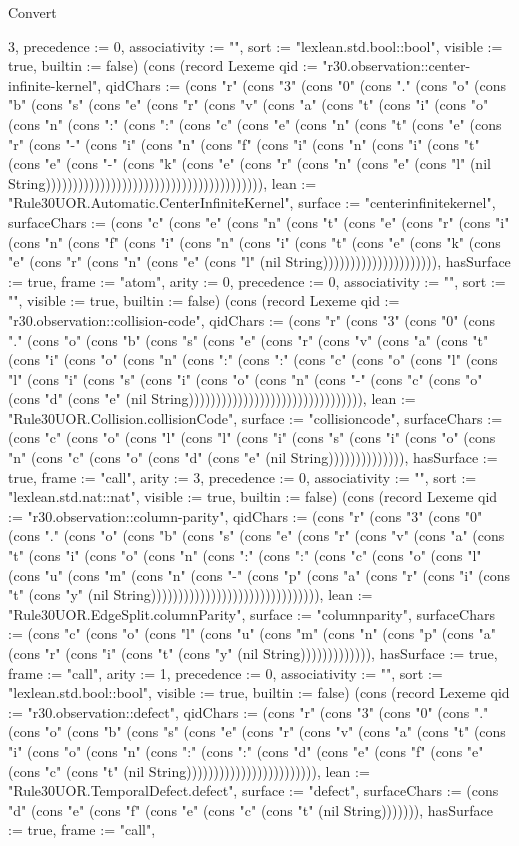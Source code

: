 \begin{lexlean}{Convert}
\begin{semanticmodule}
{3, precedence := 0, associativity := "", sort := "lexlean.std.bool::bool", visible := true, builtin := false}) (cons (record Lexeme {qid := "r30.observation::center-infinite-kernel", qidChars := (cons "r" (cons "3" (cons "0" (cons "." (cons "o" (cons "b" (cons "s" (cons "e" (cons "r" (cons "v" (cons "a" (cons "t" (cons "i" (cons "o" (cons "n" (cons ":" (cons ":" (cons "c" (cons "e" (cons "n" (cons "t" (cons "e" (cons "r" (cons "-" (cons "i" (cons "n" (cons "f" (cons "i" (cons "n" (cons "i" (cons "t" (cons "e" (cons "-" (cons "k" (cons "e" (cons "r" (cons "n" (cons "e" (cons "l" (nil String)))))))))))))))))))))))))))))))))))))))), lean := "Rule30UOR.Automatic.CenterInfiniteKernel", surface := "centerinfinitekernel", surfaceChars := (cons "c" (cons "e" (cons "n" (cons "t" (cons "e" (cons "r" (cons "i" (cons "n" (cons "f" (cons "i" (cons "n" (cons "i" (cons "t" (cons "e" (cons "k" (cons "e" (cons "r" (cons "n" (cons "e" (cons "l" (nil String))))))))))))))))))))), hasSurface := true, frame := "atom", arity := 0, precedence := 0, associativity := "", sort := "", visible := true, builtin := false}) (cons (record Lexeme {qid := "r30.observation::collision-code", qidChars := (cons "r" (cons "3" (cons "0" (cons "." (cons "o" (cons "b" (cons "s" (cons "e" (cons "r" (cons "v" (cons "a" (cons "t" (cons "i" (cons "o" (cons "n" (cons ":" (cons ":" (cons "c" (cons "o" (cons "l" (cons "l" (cons "i" (cons "s" (cons "i" (cons "o" (cons "n" (cons "-" (cons "c" (cons "o" (cons "d" (cons "e" (nil String)))))))))))))))))))))))))))))))), lean := "Rule30UOR.Collision.collisionCode", surface := "collisioncode", surfaceChars := (cons "c" (cons "o" (cons "l" (cons "l" (cons "i" (cons "s" (cons "i" (cons "o" (cons "n" (cons "c" (cons "o" (cons "d" (cons "e" (nil String)))))))))))))), hasSurface := true, frame := "call", arity := 3, precedence := 0, associativity := "", sort := "lexlean.std.nat::nat", visible := true, builtin := false}) (cons (record Lexeme {qid := "r30.observation::column-parity", qidChars := (cons "r" (cons "3" (cons "0" (cons "." (cons "o" (cons "b" (cons "s" (cons "e" (cons "r" (cons "v" (cons "a" (cons "t" (cons "i" (cons "o" (cons "n" (cons ":" (cons ":" (cons "c" (cons "o" (cons "l" (cons "u" (cons "m" (cons "n" (cons "-" (cons "p" (cons "a" (cons "r" (cons "i" (cons "t" (cons "y" (nil String))))))))))))))))))))))))))))))), lean := "Rule30UOR.EdgeSplit.columnParity", surface := "columnparity", surfaceChars := (cons "c" (cons "o" (cons "l" (cons "u" (cons "m" (cons "n" (cons "p" (cons "a" (cons "r" (cons "i" (cons "t" (cons "y" (nil String))))))))))))), hasSurface := true, frame := "call", arity := 1, precedence := 0, associativity := "", sort := "lexlean.std.bool::bool", visible := true, builtin := false}) (cons (record Lexeme {qid := "r30.observation::defect", qidChars := (cons "r" (cons "3" (cons "0" (cons "." (cons "o" (cons "b" (cons "s" (cons "e" (cons "r" (cons "v" (cons "a" (cons "t" (cons "i" (cons "o" (cons "n" (cons ":" (cons ":" (cons "d" (cons "e" (cons "f" (cons "e" (cons "c" (cons "t" (nil String)))))))))))))))))))))))), lean := "Rule30UOR.TemporalDefect.defect", surface := "defect", surfaceChars := (cons "d" (cons "e" (cons "f" (cons "e" (cons "c" (cons "t" (nil String))))))), hasSurface := true, frame := "call", }
\end{semanticmodule}
\end{lexlean}
